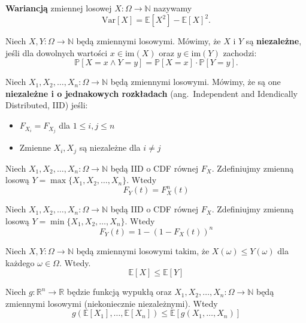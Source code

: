\begin{definition}
\textbf{Wariancją} zmiennej losowej $X:\Omega\to\mathbb{N}$ nazywamy
\[
    \mathrm{Var}[X] = \mathbb{E}[X^2]-\mathbb{E}[X]^2.
\]
\end{definition}

\begin{definition}
Niech $X,Y:\Omega\to\mathbb{N}$ będą zmiennymi losowymi.  
Mówimy, że $X$ i $Y$ są \textbf{niezależne}, jeśli dla dowolnych wartości $x \in \mathrm{im}(X)$ oraz $y \in \mathrm{im}(Y)$ zachodzi:
\[
\mathbb{P}[X = x \land Y = y] = \mathbb{P}[X = x] \cdot \mathbb{P}[Y = y].
\]
\end{definition}

\begin{definition}
Niech $X_1,X_2,\dots, X_n:\Omega\to\mathbb{N}$ będą zmiennymi losowymi. Mówimy, że są one \textbf{niezależne i o jednakowych rozkładach} (ang.~Independent and Idendically Distributed, IID) jeśli: 
\begin{itemize}
    \item $F_{X_i} = F_{X_j}$ dla $1\le i,j \le n$
    \item Zmienne $X_i,X_j$ są niezależne dla $i\ne j$
\end{itemize}  
\end{definition}

\begin{fact}\label{F:max_CDF}
Niech $X_1,X_2,\dots, X_n:\Omega\to\mathbb{N}$ będą IID o CDF równej $F_X$. Zdefiniujmy zmienną losową $Y = \max\{X_1,X_2,\dots, X_n\}$. Wtedy 
\[
    F_Y(t)=F_X^n(t)
\]
\end{fact}

\begin{fact}\label{F:min_CDF}
Niech $X_1,X_2,\dots, X_n:\Omega\to\mathbb{N}$ będą IID o CDF równej $F_X$. Zdefiniujmy zmienną losową $Y = \min\{X_1,X_2,\dots, X_n\}$. Wtedy 
\[
    F_Y(t)=1-(1-F_X(t))^n
\]
\end{fact}

\begin{fact}\label{F:montonicity_of_expectation}
Niech $X,Y:\Omega\to\mathbb{N}$ będą zmiennymi losowymi takim, że $X(\omega)\le Y(\omega)$ dla każdego $\omega\in\Omega$. Wtedy. 
\[
    \mathbb{E}[X] \le \mathbb{E}[Y]
\]
\end{fact}


\begin{fact}\label{F:Jensen} 
Niech $g:\mathbb{R}^n\to\mathbb{R}$ będzie funkcją wypukłą oraz $X_1,X_2,\dots, X_n:\Omega\to\mathbb{N}$ będą zmiennymi losowymi (niekoniecznie niezależnymi). Wtedy
\[
    g(\mathbb{E}[X_1],\dots, \mathbb{E}[X_n]) \le \mathbb{E}[g(X_1,\dots,X_n)]
\]
\end{fact}


